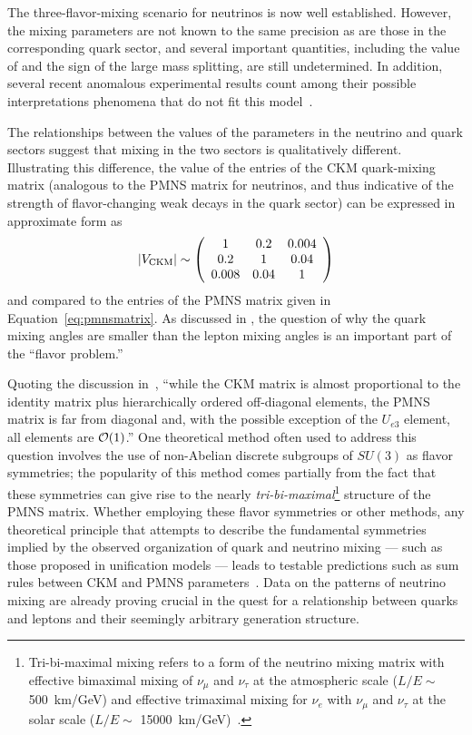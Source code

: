 The three-flavor-mixing scenario for neutrinos is now well
established. However, the mixing parameters are not known to the same precision 
as are those in the
corresponding quark sector, and several important quantities, including
the value of \deltacp and the sign of the large mass splitting, are
still undetermined. In addition, several recent
anomalous experimental results count among their possible
interpretations phenomena that do not fit this 
model~\cite{Aguilar:2001ty,AguilarArevalo:2007it,Aguilar-Arevalo:2013pmq,Mention:2011rk}.

The relationships between the values of the parameters in the neutrino
and quark sectors suggest that mixing in the two sectors is
qualitatively different. Illustrating this difference, the value of
the entries of the CKM quark-mixing matrix (analogous to the PMNS matrix for
neutrinos, and thus indicative of the strength of flavor-changing weak
decays in the quark sector) can be expressed in approximate form as
\begin{equation}
|V_{\rm CKM}|\sim \left(\begin{array}{ccc} 1 & 0.2 & 0.004\\ 0.2 & 1 & 0.04 \\ 0.008 & 0.04 & 1\end{array} \right)
\label{eq:ckmmatrix}
\end{equation}
and compared to the entries of the PMNS matrix given in Equation~\ref{eq:pmnsmatrix}.
As discussed in \cite{King:2014nza}, the question of why the quark mixing angles are
smaller than the lepton mixing angles is an important part of the ``flavor problem.''

Quoting the discussion in~\cite{deGouvea:2013onf}, ``while the CKM
matrix is almost proportional to the identity matrix plus
hierarchically ordered off-diagonal elements, the PMNS matrix is far
from diagonal and, with the possible exception of the $U_{e3}$
element, all elements are ${\cal O}(1)$.''
One theoretical method often used to address this question involves the use of non-Abelian discrete
subgroups of $SU(3)$ as flavor symmetries; the popularity of this method comes partially from
the fact that these symmetries can give rise to the nearly \emph{tri-bi-maximal}\footnote{Tri-bi-maximal mixing refers to a form of the neutrino mixing matrix with effective bimaximal mixing of $\nu_\mu$ and $\nu_\tau$
at the atmospheric scale ($L/E \sim$ \SI{500}{\km / \GeV}) and effective trimaximal
mixing for $\nu_e$ with $\nu_\mu$ and $\nu_\tau$ 
at the solar scale ($L/E \sim$ \SI{15000}{\km / \GeV})~\cite{Harrison:2002er}.} 
structure of the PMNS matrix.
Whether employing these flavor symmetries or other methods,
any theoretical principle that attempts to describe the fundamental
symmetries implied by the observed organization of quark and neutrino
mixing --- such as those proposed in unification models --- leads to
testable predictions such as sum rules between CKM and PMNS
parameters~\cite{King:2014nza,deGouvea:2013onf,Mohapatra:2005wg,Albright:2006cw}.
Data on the patterns of neutrino mixing 
are already proving crucial in the quest for a 
relationship between quarks and leptons and their seemingly arbitrary generation
structure.  

